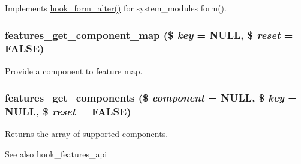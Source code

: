 Implements \hyperlink{group__hooks_ga6df3cea27ae1407aeef4eae5444cb213}{hook\_\-form\_\-alter()} for system\_\-modules form(). \hypertarget{features_8module_a0b9ee0b432af2d3709e1f413923c3ae2}{
\subsubsection[{features\_\-get\_\-component\_\-map}]{\setlength{\rightskip}{0pt plus 5cm}features\_\-get\_\-component\_\-map (\$ {\em key} = {\ttfamily NULL}, \/  \$ {\em reset} = {\ttfamily FALSE})}}
\label{features_8module_a0b9ee0b432af2d3709e1f413923c3ae2}
Provide a component to feature map. \hypertarget{features_8module_a4b2d2e6aaa5c36d781cdda657285ee12}{
\subsubsection[{features\_\-get\_\-components}]{\setlength{\rightskip}{0pt plus 5cm}features\_\-get\_\-components (\$ {\em component} = {\ttfamily NULL}, \/  \$ {\em key} = {\ttfamily NULL}, \/  \$ {\em reset} = {\ttfamily FALSE})}}
\label{features_8module_a4b2d2e6aaa5c36d781cdda657285ee12}
Returns the array of supported components.

\begin{DoxySeeAlso}{See also}
hook\_\-features\_\-api
\end{DoxySeeAlso}

